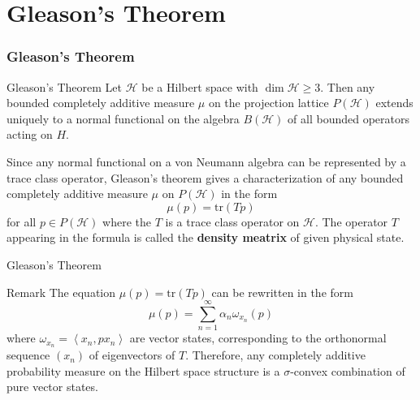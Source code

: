 \documentclass{beamer}
\begin{document}
\section{Gleason's Theorem}
\begin{frame}
    \frametitle{Gleason's Theorem}
    \begin{alertblock}{Gleason's Theorem}
        Let \(\mathcal{H}\) be a Hilbert space with \(\dim \mathcal{H} \ge 3\). Then any bounded completely additive measure \(\mu\) on the projection lattice \(P(\mathcal{H})\) extends uniquely to a normal functional on the algebra \(B(\mathcal{H})\) of all bounded operators acting on \(H\).
    \end{alertblock}
    Since any normal functional on a von Neumann algebra can be represented by a trace class operator, Gleason's theorem gives a characterization of any bounded completely additive measure \(\mu\) on \(P(\mathcal{H})\) in the form
    \begin{equation}
        \mu(p)=\mathrm{tr} (Tp)
    \end{equation}
    for all \(p \in P(\mathcal{H})\) where the \(T\) is a trace class operator on \(\mathcal{H}\). The operator \(T\) appearing in the formula is called the \textbf{density meatrix} of given physical state.
\end{frame}

\begin{frame}{Gleason's Theorem}
    \begin{block}{Remark}
        The equation \(\mu(p)=\mathrm{tr} (Tp)\) can be rewritten in the form
        \begin{equation}
            \mu(p)=\sum_{n=1}^{\infty} \alpha_n \omega_{x_n}(p)
        \end{equation}
        where \(\omega_{x_n}=\left \langle x_n,px_n \right \rangle\) are vector states, corresponding to the orthonormal sequence \((x_n)\) of eigenvectors of \(T\).   Therefore, any completely additive probability measure on the Hilbert space structure is a \(\sigma\)-convex combination of pure vector states.
    \end{block}


\end{frame}
\end{document}
